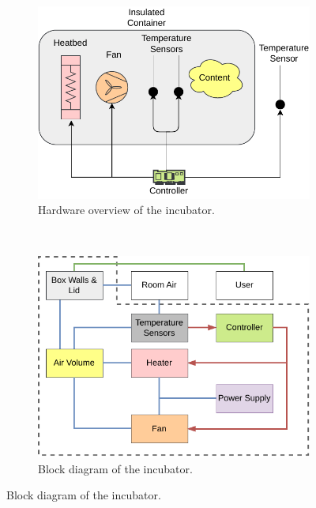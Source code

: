 \begin{figure}[ht]
	\centering
	\begin{subfigure}[t]{0.48\columnwidth}
		\centering
		\includegraphics[width=\textwidth]{images/system_hardware.pdf}
		\caption{Hardware overview of the incubator.}
		\label{subfig:incubator_hw}
	\end{subfigure}%
	~
	\begin{subfigure}[t]{0.48\columnwidth}
		\centering
		\includegraphics[width=\textwidth]{images/system_block.pdf}
		\caption{Block diagram of the incubator.}
		\label{subfig:incubator_blocks}
	\end{subfigure}%


\end{figure}
